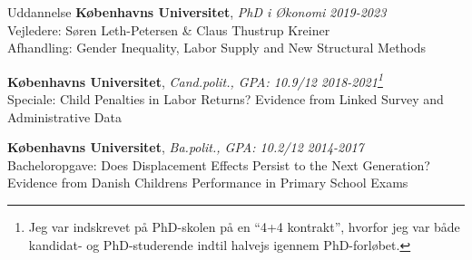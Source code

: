 \documentclass[
	10pt, %
]{resume} %
\begin{document}

\begin{rSection}{Uddannelse}
    \textbf{Københavns Universitet}, \textit{PhD i Økonomi} \hfill \textit{2019-2023} \\
    Vejledere: Søren Leth-Petersen \& Claus Thustrup Kreiner \\
    Afhandling: {Gender Inequality, Labor Supply and New Structural Methods}

    \textbf{Københavns Universitet}, \textit{Cand.polit., GPA: 10.9/12} \hfill \textit{2018-2021\footnote{Jeg var indskrevet på PhD-skolen på en ``4+4 kontrakt'', hvorfor jeg var både kandidat- og PhD-studerende indtil halvejs igennem PhD-forløbet.}} \\
    Speciale: {Child Penalties in Labor Returns? Evidence from Linked Survey and Administrative Data}

    \textbf{Københavns Universitet}, \textit{Ba.polit., GPA: 10.2/12} \hfill \textit{2014-2017} \\
    Bacheloropgave: {Does Displacement Effects Persist to the Next Generation? Evidence from Danish Childrens Performance in Primary School Exams}
\end{rSection}

\end{document}
